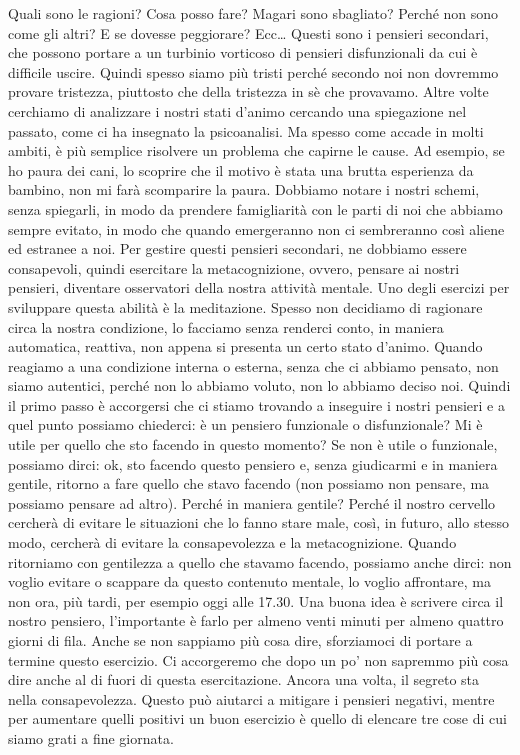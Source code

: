 \documentclass[12pt]{book} %
\begin{document}
Quali sono le ragioni? Cosa posso fare? Magari sono sbagliato? Perché non sono come gli altri? E se dovesse peggiorare?
Ecc… Questi sono i pensieri secondari, che possono portare a un turbinio vorticoso di pensieri disfunzionali da cui è
difficile uscire. Quindi spesso siamo più tristi perché secondo noi non dovremmo provare tristezza, piuttosto che della
tristezza in sè che provavamo. Altre volte cerchiamo di analizzare i nostri stati d'animo cercando
una spiegazione nel passato, come ci ha insegnato la psicoanalisi. Ma spesso come accade in molti ambiti, è più
semplice risolvere un problema che capirne le cause. Ad esempio, se ho paura dei cani, lo scoprire che il motivo è
stata una brutta esperienza da bambino, non mi farà scomparire la paura. Dobbiamo notare i nostri schemi, senza
spiegarli, in modo da prendere famigliarità con le parti di noi che abbiamo sempre evitato, in modo che quando
emergeranno non ci sembreranno così aliene ed estranee a noi. Per gestire questi pensieri secondari, ne dobbiamo essere
consapevoli, quindi esercitare la metacognizione, ovvero, pensare ai nostri pensieri, diventare osservatori della
nostra attività mentale. Uno degli esercizi per sviluppare questa abilità è la meditazione. Spesso non decidiamo di
ragionare circa la nostra condizione, lo facciamo senza renderci conto, in maniera automatica, reattiva, non appena si
presenta un certo stato d'animo. Quando reagiamo a una condizione interna o esterna, senza che ci
abbiamo pensato, non siamo autentici, perché non lo abbiamo voluto, non lo abbiamo deciso noi. Quindi il primo passo è
accorgersi che ci stiamo trovando a inseguire i nostri pensieri e a quel punto possiamo chiederci: è un pensiero
funzionale o disfunzionale? Mi è utile per quello che sto facendo in questo momento? Se non è utile o funzionale,
possiamo dirci: ok, sto facendo questo pensiero e, senza giudicarmi e in maniera gentile, ritorno a fare quello che
stavo facendo (non possiamo non pensare, ma possiamo pensare ad altro). 
Perché in maniera gentile? Perché il nostro cervello cercherà di evitare le situazioni che lo fanno
stare male, così, in futuro, allo stesso modo, cercherà di evitare la consapevolezza e la metacognizione. Quando
ritorniamo con gentilezza a quello che stavamo facendo, possiamo anche dirci: non voglio evitare o scappare da questo
contenuto mentale, lo voglio affrontare, ma non ora, più tardi, per esempio oggi alle 17.30. Una buona idea è scrivere
circa il nostro pensiero, l'importante è farlo per almeno venti minuti per almeno quattro giorni
di fila. Anche se non sappiamo più cosa dire, sforziamoci di portare a termine questo esercizio. Ci accorgeremo che
dopo un po' non sapremmo più cosa dire anche al di fuori di questa esercitazione. Ancora una volta, il segreto sta
nella consapevolezza. Questo può aiutarci a mitigare i pensieri negativi, mentre per aumentare quelli positivi un buon esercizio è quello di elencare tre cose di cui siamo grati a fine giornata.
\end{document}

